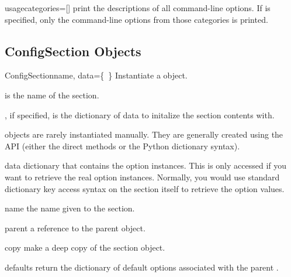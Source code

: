 \documentclass{manual}
\begin{document}
\begin{methoddesc}[ConfigManager]{usage}{categories=[]}
print the descriptions of all command-line options.  If 
is specified, only the command-line options from those categories is printed.
\end{methoddesc}


\subsection{ConfigSection Objects}

\begin{classdesc}{ConfigSection}{name, data=\{~\}}
Instantiate a  object.  

 is the name of the section.

, if specified, is the dictionary of data to initalize
the section contents with.
\end{classdesc}

 objects are rarely instantiated manually.  They 
are generally created using the  API (either the 
direct methods or the Python dictionary syntax).


\begin{memberdesc}[ConfigSection]{data}
dictionary that contains the option instances.  This is only accessed
if you want to retrieve the real option instances.  Normally, you would
use standard dictionary key access syntax on the section itself to
retrieve the option values.
\end{memberdesc}

\begin{memberdesc}[ConfigSection]{name}
the name given to the section.
\end{memberdesc}

\begin{memberdesc}[ConfigSection]{parent}
a reference to the parent  object.
\end{memberdesc}

\begin{methoddesc}[ConfigSection]{copy}{}
make a deep copy of the section object.
\end{methoddesc}

\begin{methoddesc}[ConfigSection]{defaults}{}
return the dictionary of default options associated with the parent
.
\end{methoddesc}
\end{document}
